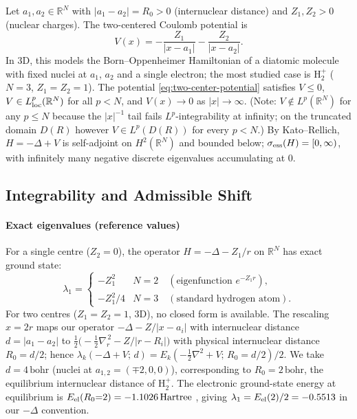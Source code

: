 \documentclass[11pt]{article}
\theoremstyle{plain}
\theoremstyle{definition}
\theoremstyle{remark}
\newcommand{\R}{\mathbb{R}}
\begin{document}
Let $a_1, a_2 \in \R^N$ with $|a_1 - a_2| = R_0 > 0$ (internuclear
distance) and $Z_1, Z_2 > 0$ (nuclear charges).  The two-centered
Coulomb potential is
\begin{equation}
\label{eq:two-center-potential}
  V(x) = -\frac{Z_1}{|x - a_1|} - \frac{Z_2}{|x - a_2|}.
\end{equation}
In 3D, this models the Born--Oppenheimer Hamiltonian of a diatomic
molecule with fixed nuclei at $a_1$, $a_2$ and a single electron;
the most studied case is $\mathrm{H}_2^+$ ($N=3$, $Z_1=Z_2=1$).
The potential \eqref{eq:two-center-potential} satisfies
$V \le 0$, $V \in L^p_{\rm loc}(\R^N)$ for all $p < N$, and
$V(x) \to 0$ as $|x| \to \infty$. (Note: $V \notin L^p(\R^N)$ for any
$p\le N$ because the $|x|^{-1}$ tail fails $L^p$-integrability at
infinity; on the truncated domain $D(R)$ however
$V \in L^p(D(R))$ for every $p<N$.)
By Kato--Rellich, $H = -\Delta + V$ is self-adjoint on $H^2(\R^N)$ and
bounded below; $\sigma_{\rm ess}(H) = [0,\infty)$, with infinitely
many negative discrete eigenvalues accumulating at $0$.

\subsection{Integrability and Admissible Shift}
\label{subsec:twocenter-params}

\paragraph{Exact eigenvalues (reference values)}
For a single centre ($Z_2=0$), the operator $H=-\Delta-Z_1/r$ on $\R^N$
has exact ground state:
\begin{equation}
\label{eq:exact-gs}
  \lambda_1 =
  \begin{cases}
    -Z_1^2 & N=2 \quad (\text{eigenfunction } e^{-Z_1 r}), \\
    -Z_1^2/4 & N=3 \quad (\text{standard hydrogen atom}).
  \end{cases}
\end{equation}
For two centres ($Z_1=Z_2=1$, 3D), no closed
form is available.  The rescaling $x=2r$ maps our operator
$-\Delta-Z/|x{-}a_i|$ with internuclear distance $d=|a_1-a_2|$ to
$\tfrac{1}{2}\bigl(-\tfrac{1}{2}\nabla_r^{\,2}-Z/|r-R_i|\bigr)$
with physical internuclear distance $R_0=d/2$; hence
$\lambda_k(-\Delta+V;\,d)=E_k(-\tfrac{1}{2}\nabla^2+V;\,R_0{=}d/2)/2$.
We take $d=4\,\mathrm{bohr}$ (nuclei at $a_{1,2}=(\mp 2,0,0)$),
corresponding to $R_0=2\,\mathrm{bohr}$, the equilibrium internuclear
distance of $\mathrm{H}_2^+$.  The electronic ground-state energy at
equilibrium is $E_{\rm el}(R_0{=}2)=-1.1026\,\mathrm{Hartree}$
\cite{Bates1953,MadsenPeek1971}, giving
$\lambda_1= E_{\rm el}(2)/2=-0.5513$
in our $-\Delta$ convention.
\end{document}
